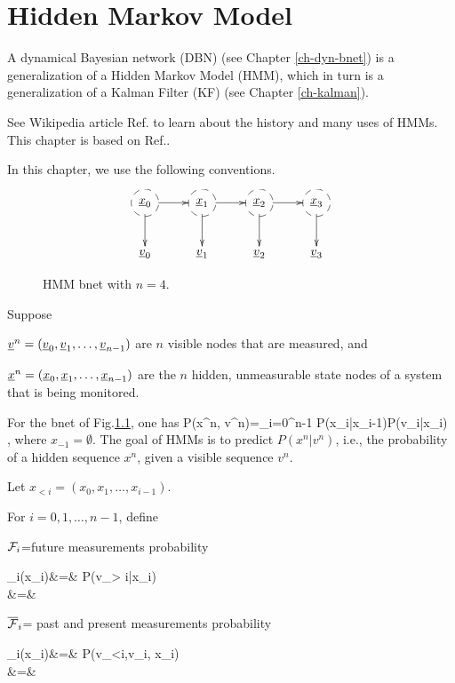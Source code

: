 \chapter{Hidden Markov Model}
\label{ch-hmm}

A dynamical Bayesian
network (DBN)  (see Chapter
\ref{ch-dyn-bnet})
is a generalization
of a
Hidden Markov Model (HMM), which
in turn is 
 a  generalization of a
Kalman Filter (KF) (see Chapter
\ref{ch-kalman}).

See Wikipedia article 
Ref.\cite{wiki-hmm} to learn 
about the history 
and many uses of HMMs. This
chapter is based on
Ref.\cite{nuel}.

In this
chapter,
we use the following conventions.

\bnetConventions


\begin{figure}[h!]
\centering
$$\xymatrix{
*++[F-o]{\rvx_0}\ar[d]\ar[r]&
*++[F-o]{\rvx_1}\ar[d]\ar[r]&
*++[F-o]{\rvx_2}\ar[d]\ar[r]&
*++[F-o]{\rvx_3}\ar[d]\\
\rvv_0&
\rvv_1&
\rvv_2&
\rvv_3
}$$
\caption{HMM bnet
with $n=4$.}
\label{fig-hmm}
\end{figure}

Suppose 

${\underline{v}}^n=({\underline{v}}_0, {\underline{v}}_1, 
\ldots, {\underline{v}}_{n-1})$
are $n$ visible nodes that
are measured,
and 

${\underline{x}}^n=({\underline{x}}_0, {\underline{x}}_1, 
\ldots, {\underline{x}}_{n-1})$
are the $n$ hidden, unmeasurable 
state nodes of a system
that is being monitored.



For the bnet of Fig.\ref{fig-hmm},
one has
\beq
P(x^n, v^n)=\prod_{i=0}^{n-1}
P(x_i|x_{i-1})P(v_i|x_i)
\;,
\eeq
where $x_{-1}=\emptyset$.
The goal of HMMs is to
predict $P(x^n|v^n)$, 
i.e., the probability
of a hidden sequence
$x^n$, 
given a visible sequence $v^n$.

Let
$x_{<i} =(x_0, x_1, \dots, x_{i-1})$.

For $i=0,1, \dots, n-1$, define

${\cal F}_i$=future measurements probability

\beqa
\calf_i(x_i)&=&
P(v_{> i}|x_i)
\\
&=&
\eeqa

$\overline{{\cal F}}_i$= 
past and present measurements  probability

\beqa
\ol{\calf}_i(x_i)&=&
P(v_{<i},v_i, x_i)
\\
&=&
\eeqa

